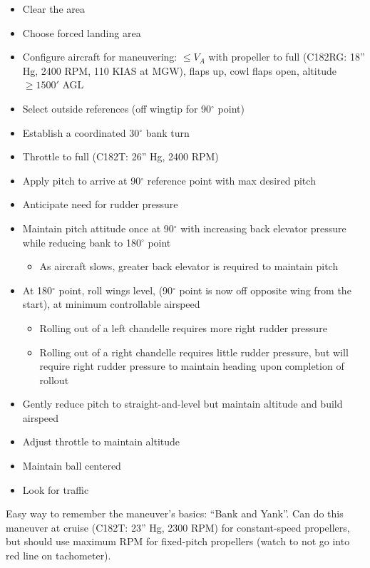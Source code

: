 \begin{itemize}
  \item Clear the area
  \item Choose forced landing area
  \item Configure aircraft for maneuvering: $\leq V_A$ with propeller to full
    (C182RG: 18'' Hg, 2400 RPM, 110 KIAS at MGW), flaps up, cowl flaps open,
    altitude $\geq 1500'$ AGL
  \item Select outside references (off wingtip for 90$^\circ$ point) 
  \item Establish a coordinated 30$^\circ$ bank turn
  \item Throttle to full (C182T: 26'' Hg, 2400 RPM)
  \item Apply pitch to arrive at 90$^\circ$ reference point with max desired
    pitch
  \item Anticipate need for rudder pressure
  \item Maintain pitch attitude once at 90$^\circ$ with increasing back elevator
    pressure while reducing bank to 180$^\circ$ point
    \begin{itemize}
      \item As aircraft slows, greater back elevator is required to maintain
        pitch
    \end{itemize}
  \item At 180$^\circ$ point, roll wings level, (90$^\circ$ point is now off
    opposite wing from the start), at minimum controllable airspeed
    \begin{itemize}
      \item Rolling out of a left chandelle requires more right rudder pressure
      \item Rolling out of a right chandelle requires little rudder pressure,
        but will require right rudder pressure to maintain heading upon
        completion of rollout
    \end{itemize}
  \item Gently reduce pitch to straight-and-level but maintain altitude and
    build airspeed
  \item Adjust throttle to maintain altitude
  \item Maintain ball centered
  \item Look for traffic
\end{itemize}

Easy way to remember the maneuver's basics: ``Bank and Yank''. Can do this
maneuver at cruise (C182T: 23'' Hg, 2300 RPM) for constant-speed propellers,
but should use maximum RPM for fixed-pitch propellers (watch to not go into red
line on tachometer).

